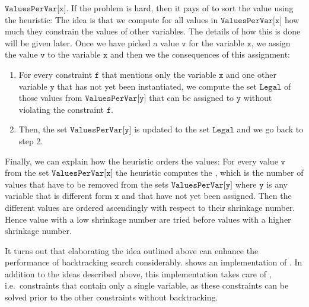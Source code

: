 \begin{enumerate}
      $\texttt{ValuesPerVar[x]}$.  If the problem is hard, then it pays of to sort the value using the
       heuristic:  The idea is that
      we compute for all values in  $\texttt{ValuesPerVar[x]}$ how much they constrain the values 
      of other variables.  The details of how this is done will be given later.  Once we have picked a value
      $\texttt{v}$ for the variable $\texttt{x}$, we assign the value $\texttt{v}$ to the variable $\texttt{x}$ and then we
       the consequences of this assignment: 
      \begin{enumerate}
      \item For every constraint $\texttt{f}$ that mentions only the variable $\texttt{x}$ and one other variable
            $\texttt{y}$ that has not yet been instantiated, we compute the set $\texttt{Legal}$ of those values from 
            $\texttt{ValuesPerVar[y]}$ that can be assigned to $\texttt{y}$ without violating the constraint
            $\texttt{f}$.
            
      \item Then, the set $\texttt{ValuesPerVar[y]}$ is updated to the set $\texttt{Legal}$ and we go back to
            step 2.
      \end{enumerate}
      Finally, we can explain how the  heuristic orders the values:  For every value
      $\texttt{v}$ from the set $\texttt{ValuesPerVar[x]}$ the heuristic computes the ,
      which is the number of values that have to be removed from the sets $\texttt{ValuesPerVar[y]}$ where
      $\texttt{y}$ is any variable that is different form $\texttt{x}$ and that have not yet been assigned.
      Then the different values are ordered ascendingly with respect to their shrinkage number.  Hence value 
      with a low shrinkage number are tried before values with a higher shrinkage number.
\end{enumerate}
It turns out that elaborating the idea outlined above can enhance the performance of backtracking search
considerably.   shows an implementation of 
.  In addition to the ideas described above, this implementation takes care of
, i.e.~constraints that contain only a single variable, as these constraints can be
solved prior to the other constraints without backtracking.


